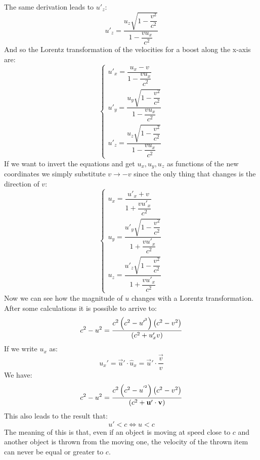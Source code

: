 The same derivation leads to $u'_z$:
\begin{equation}
  u'_z = \dfrac{u_z\sqrt{1-\dfrac{v^2}{c^2}}}{1 - \dfrac{v u_x}{c^2}}
\end{equation}
And so the Lorentz transformation of the velocities for a boost along the x-axis are:
\begin{equation}
  \begin{cases}
    u'_x = \dfrac{u_x - v}{1 - \dfrac{v u_x}{c^2}} \\[18pt]
    u'_y = \dfrac{u_y\sqrt{1-\dfrac{v^2}{c^2}}}{1 - \dfrac{v u_x}{c^2}} \\[18pt]
    u'_z = \dfrac{u_z\sqrt{1-\dfrac{v^2}{c^2}}}{1 - \dfrac{v u_x}{c^2}}
  \end{cases}
\end{equation}
If we want to invert the equations and get $u_x, u_y, u_z$ as functions of the new coordinates we simply substitute $v \rightarrow -v$ since the only thing that changes is the direction of $v$:
\begin{equation}
  \begin{cases}
    u_x = \dfrac{u'_x + v}{1 + \dfrac{v u'_x}{c^2}} \\[18pt]
    u_y = \dfrac{u'_y\sqrt{1-\dfrac{v^2}{c^2}}}{1 + \dfrac{v u'_x}{c^2}} \\[18pt]
    u_z = \dfrac{u'_z\sqrt{1-\dfrac{v^2}{c^2}}}{1 + \dfrac{v u'_x}{c^2}}
  \end{cases}
\end{equation}
Now we can see how the magnitude of $u$ changes with a Lorentz transformation. After some calculations it is possible to arrive to:
\begin{equation}
  c^2 - u^2 = \dfrac{c^2\left(c^2 - u'^{^2}\right)\left(c^2 - v^2\right)}{\left(c^2 + u'_x v\right)}
\end{equation}
If we write $u_x$ as:
\begin{equation}
  u_x' = \vec{u}' \cdot \hat{u}_x = \vec{u}' \cdot \dfrac{\vec{v}}{v}
\end{equation}
We have:
\begin{equation}
  c^2 - u^2 = \dfrac{c^2\left(c^2 - u^{'^2}\right)\left(c^2 - v^2\right)}{\left(c^2 + \vb{u}'\cdot\vb{v}\right)}
\end{equation}
This also leads to the result that:
\begin{equation}
  u' < c \iff u < c
\end{equation}
The meaning of this is that, even if an object is moving at speed close to $c$ and another object is thrown from the moving one, the velocity of the thrown item can never be equal or greater to $c$.\\
